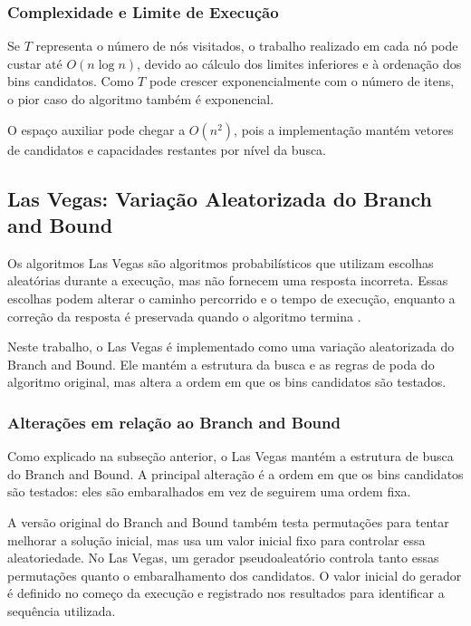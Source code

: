 \documentclass[12pt]{article}
\begin{document}
\subsubsection{Complexidade e Limite de Execução}

Se \(T\) representa o número de nós visitados, o trabalho realizado em cada nó pode custar até \(O(n\log n)\), devido ao cálculo dos limites inferiores e à ordenação dos bins candidatos. Como \(T\) pode crescer exponencialmente com o número de itens, o pior caso do algoritmo também é exponencial.

O espaço auxiliar pode chegar a \(O(n^2)\), pois a implementação mantém vetores de candidatos e capacidades restantes por nível da busca.

\subsection{Las Vegas: Variação Aleatorizada do Branch and Bound}

Os algoritmos Las Vegas são algoritmos probabilísticos que utilizam escolhas aleatórias durante a execução, mas não fornecem uma resposta incorreta. Essas escolhas podem alterar o caminho percorrido e o tempo de execução, enquanto a correção da resposta é preservada quando o algoritmo termina \cite{figueiredo2007}.

Neste trabalho, o Las Vegas é implementado como uma variação aleatorizada do Branch and Bound. Ele mantém a estrutura da busca e as regras de poda do algoritmo original, mas altera a ordem em que os bins candidatos são testados.

\subsubsection{Alterações em relação ao Branch and Bound}

Como explicado na subseção anterior, o Las Vegas mantém a estrutura de busca do Branch and Bound. A principal alteração é a ordem em que os bins candidatos são testados: eles são embaralhados em vez de seguirem uma ordem fixa.

A versão original do Branch and Bound também testa permutações para tentar melhorar a solução inicial, mas usa um valor inicial fixo para controlar essa aleatoriedade. No Las Vegas, um gerador pseudoaleatório controla tanto essas permutações quanto o embaralhamento dos candidatos. O valor inicial do gerador é definido no começo da execução e registrado nos resultados para identificar a sequência utilizada.
\end{document}
